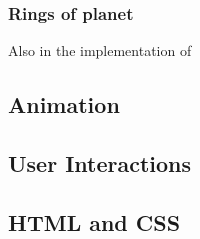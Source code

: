 \documentclass{article}
\begin{document}
\subsubsection{Rings of planet}
Also in the implementation of 


\subsection{Animation}


\subsection{User Interactions}


\subsection{HTML and CSS}
\end{document}
